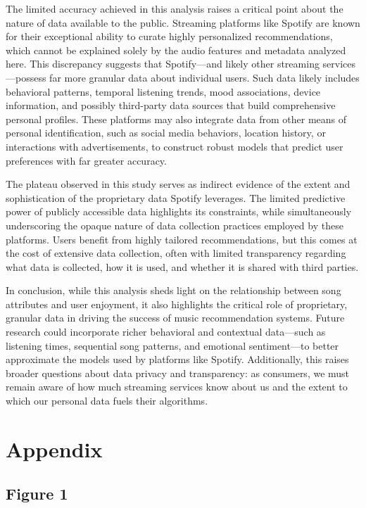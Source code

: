\documentclass[11pt]{article}
\begin{document}
The limited accuracy achieved in this analysis raises a critical point
about the nature of data available to the public. Streaming platforms
like Spotify are known for their exceptional ability to curate highly
personalized recommendations, which cannot be explained solely by the
audio features and metadata analyzed here. This discrepancy suggests
that Spotify---and likely other streaming services---possess far more
granular data about individual users. Such data likely includes
behavioral patterns, temporal listening trends, mood associations,
device information, and possibly third-party data sources that build
comprehensive personal profiles. These platforms may also integrate data
from other means of personal identification, such as social media
behaviors, location history, or interactions with advertisements, to
construct robust models that predict user preferences with far greater
accuracy.

The plateau observed in this study serves as indirect evidence of the
extent and sophistication of the proprietary data Spotify leverages. The
limited predictive power of publicly accessible data highlights its
constraints, while simultaneously underscoring the opaque nature of data
collection practices employed by these platforms. Users benefit from
highly tailored recommendations, but this comes at the cost of extensive
data collection, often with limited transparency regarding what data is
collected, how it is used, and whether it is shared with third parties.

In conclusion, while this analysis sheds light on the relationship
between song attributes and user enjoyment, it also highlights the
critical role of proprietary, granular data in driving the success of
music recommendation systems. Future research could incorporate richer
behavioral and contextual data---such as listening times, sequential
song patterns, and emotional sentiment---to better approximate the
models used by platforms like Spotify. Additionally, this raises broader
questions about data privacy and transparency: as consumers, we must
remain aware of how much streaming services know about us and the extent
to which our personal data fuels their algorithms.

    \section{Appendix}\label{appendix}

    \subsection{Figure 1}\label{figure-1}
\end{document}
